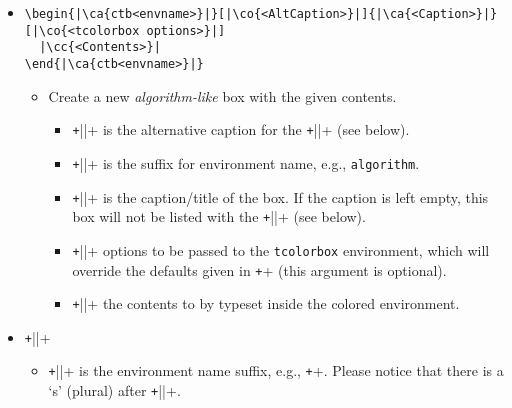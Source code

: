 \documentclass{article}
\begin{document}
\begin{itemize}
 \item \begin{verbatim}
\begin{|\ca{ctb<envname>}|}[|\co{<AltCaption>}|]{|\ca{<Caption>}|}[|\co{<tcolorbox options>}|]
  |\cc{<Contents>}|
\end{|\ca{ctb<envname>}|}
\end{verbatim}
  \begin{itemize}
    \item Create a new \emph{algorithm-like} box with the given contents.
    \begin{itemize}
      \item \texttt+||+ is the alternative
            caption for the
            \texttt+\cthlistof||+
            (see below).
      \item \texttt+||+ is the suffix for environment name,
            e.g., \verb+algorithm+.
      \item \texttt+||+ is the caption/title of
            the box.  If the caption is left empty, this box will not be listed with the
            \texttt+\cthlistof||+
            (see below).
      \item \texttt+||+ options to be
            passed to the \verb+tcolorbox+ environment, which will override the defaults
            given in \texttt+\cthnewalgorithm+  (this argument is optional).
      \item \texttt+||+ the contents to by typeset inside the colored environment.
    \end{itemize}
  \end{itemize}

  \item \texttt+\cthlistof||+
  \begin{itemize}
      \item \texttt+||+ is the environment name
            suffix, e.g., \texttt+\cthlistofalgorithms+.
            Please notice that there is a `s' (plural) after
            \texttt+||+.
  \end{itemize}
\end{itemize}
\end{document}
